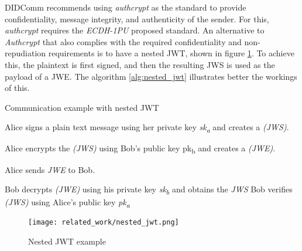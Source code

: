 DIDComm recommends using \emph{authcrypt} as the standard to provide confidentiality, message integrity, and authenticity of the sender. For this, \emph{authcrypt} requires the \emph{ECDH-1PU} proposed standard. An alternative to \emph{Authcrypt} that also complies with the required confidentiality and non-repudiation requirements is to have a nested JWT, shown in figure \ref{fig:nested_jwt}. To achieve this, the plaintext is first signed, and then the resulting JWS is used as the payload of a JWE. The algorithm \ref{alg:nested_jwt} illustrates better the workings of this.

\begin{algorithm}[H]
  \caption{Communication example with nested JWT}
  \label{alg:nested_jwt}
    \begin{algorithmic}[1]
      \State Alice signs a plain text message using her private key \emph{sk\textsubscript{a}} and creates a \emph{(JWS)}.
  
      \State Alice encrypts the \emph{(JWS)} using Bob's public key pk\textsubscript{b} and creates a \emph{(JWE)}.
  
      \State Alice sends \emph{JWE} to Bob.
  
      \State Bob decrypts \emph{(JWE)} using his private key \emph{sk\textsubscript{b}} and obtains the \emph{JWS}
      \State Bob verifies \emph{(JWS)} using Alice's public key \emph{pk\textsubscript{a}}
  \end{algorithmic}
\end{algorithm}
  
\begin{figure}[H]
  \centering
  \texttt{[image: related\_work/nested\_jwt.png]}
  \caption{Nested JWT example}
  \label{fig:nested_jwt}
\end{figure}

 



